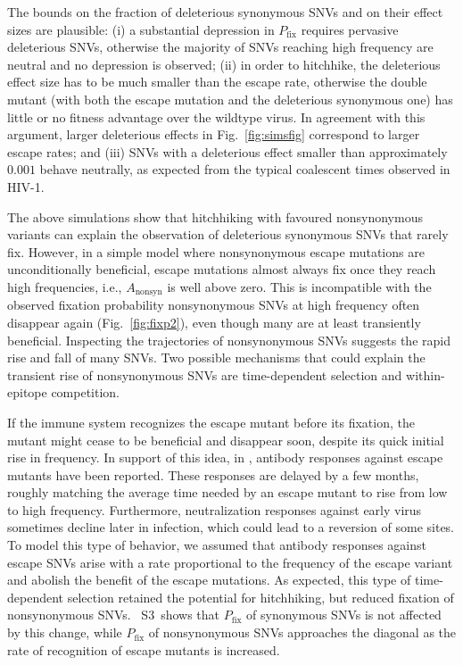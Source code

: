 \documentclass[11pt]{article}
\newcommand{\pfix}{P_{\mathrm{fix}}}
\newcommand{\FIG}[1]{Fig.~\ref{fig:#1}}
\newcommand{\timedependence}{3}
\begin{document}
The bounds on the fraction of deleterious synonymous SNVs and
on their effect sizes are plausible:
(i) a substantial depression in $\pfix$ requires pervasive deleterious SNVs, otherwise
the majority of SNVs reaching high frequency are neutral and no depression is
observed; (ii) in order to hitchhike, the deleterious effect size has to be much
smaller than the escape rate, otherwise the double mutant (with both the escape
mutation and the deleterious synonymous one) has little or no fitness advantage
over the wildtype virus. In agreement with this argument, larger deleterious
effects in \FIG{simsfig} correspond to larger escape rates; and (iii) SNVs
with a deleterious effect smaller than approximately $0.001$ behave neutrally,
as expected from the typical coalescent times observed in HIV-1.

The above simulations show that hitchhiking with favoured nonsynonymous
variants can explain the observation of
deleterious synonymous SNVs that rarely fix. However, in a simple model where
nonsynonymous escape mutations are unconditionally beneficial, escape mutations almost
always fix once they reach high frequencies, i.e., $A_{\mathrm{nonsyn}}$ is well
above zero. This is incompatible with the observed fixation probability
nonsynonymous SNVs at high frequency often disappear again (\FIG{fixp2}), even
though many are at least transiently beneficial. Inspecting the trajectories of
nonsynonymous SNVs suggests the rapid rise and fall of many SNVs. Two
possible mechanisms that could explain the transient rise of
nonsynonymous SNVs are time-dependent selection and within-epitope competition.

If the immune system recognizes the escape mutant before its fixation,
the mutant might cease to be beneficial and disappear soon, despite its
quick initial rise in frequency. In support of this idea, in
\citet{richman_rapid_2003,wei_antibody_2003,bunnik_autologous_2008},
antibody responses against escape mutants have been reported. These
responses are delayed by a few months, roughly matching the average time
needed by an escape mutant to rise from low to high
frequency. Furthermore, neutralization responses against early virus
sometimes decline later in infection, which could lead to a reversion of
some sites. To model
this type of behavior, we assumed that antibody responses against escape
SNVs arise with a rate proportional to the frequency of the escape
variant and abolish the benefit of the escape mutations. As expected,
this type of time-dependent selection retained the potential for
hitchhiking, but reduced fixation of nonsynonymous SNVs.
\figurename~S\timedependence~shows that $\pfix$ of synonymous SNVs is
not affected by this change, while $\pfix$ of nonsynonymous SNVs
approaches the diagonal as the rate of recognition of escape mutants is
increased.
\end{document}
